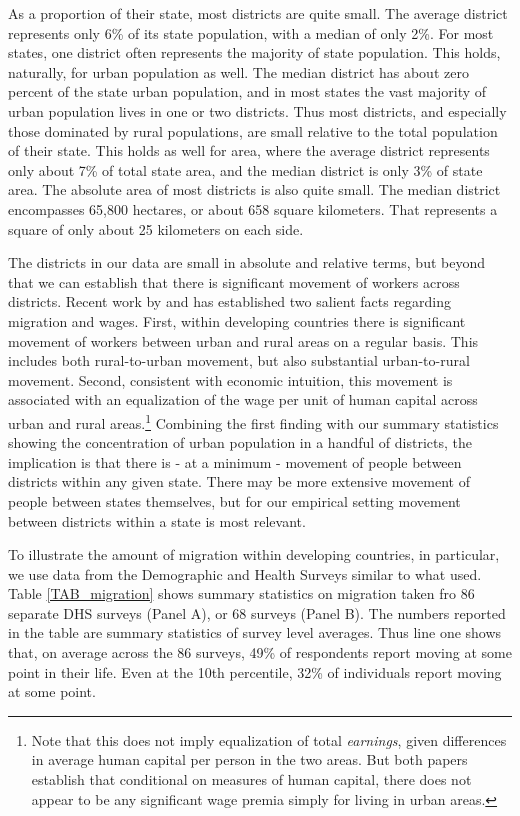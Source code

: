\documentclass[11pt]{article}
\begin{document}
As a proportion of their state, most districts are quite small. The average district represents only 6\% of its state population, with a median of only 2\%. For most states, one district often represents the majority of state population. This holds, naturally, for urban population as well. The median district has about zero percent of the state urban population, and in most states the vast majority of urban population lives in one or two districts. Thus most districts, and especially those dominated by rural populations, are small relative to the total population of their state. This holds as well for area, where the average district represents only about 7\% of total state area, and the median district is only 3\% of state area. The absolute area of most districts is also quite small. The median district encompasses 65,800 hectares, or about 658 square kilometers. That represents a square of only about 25 kilometers on each side. 

The districts in our data are small in absolute and relative terms, but beyond that we can establish that there is significant movement of workers across districts. Recent work by \cite{young2013inequality} and \cite{hklm2017} has established two salient facts regarding migration and wages. First, within developing countries there is significant movement of workers between urban and rural areas on a regular basis. This includes both rural-to-urban movement, but also substantial urban-to-rural movement. Second, consistent with economic intuition, this movement is associated with an equalization of the wage per unit of human capital across urban and rural areas.\footnote{Note that this does not imply equalization of total \textit{earnings}, given differences in average human capital per person in the two areas. But both papers establish that conditional on measures of human capital, there does not appear to be any significant wage premia simply for living in urban areas.} Combining the first finding with our summary statistics showing the concentration of urban population in a handful of districts, the implication is that there is - at a minimum - movement of people between districts within any given state. There may be more extensive movement of people between states themselves, but for our empirical setting movement between districts within a state is most relevant.

To illustrate the amount of migration within developing countries, in particular, we use data from the Demographic and Health Surveys \citep{DHS} similar to what \cite{young2013inequality} used. Table \ref{TAB_migration} shows summary statistics on migration taken fro 86 separate DHS surveys (Panel A), or 68 surveys (Panel B). The numbers reported in the table are summary statistics of survey level averages. Thus line one shows that, on average across the 86 surveys, 49\% of respondents report moving at some point in their life. Even at the 10th percentile, 32\% of individuals report moving at some point. 
\end{document}
